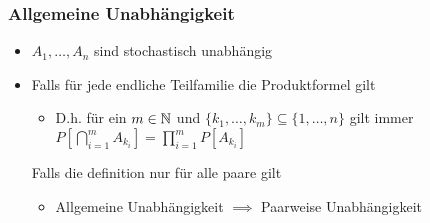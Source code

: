\subsubsection{Allgemeine Unabhängigkeit}
\begin{itemize}
    \item $A_1, \dots, A_n$ sind stochastisch unabhängig
    \item Falls für jede endliche Teilfamilie die Produktformel gilt
        \begin{itemize}
            \item D.h. für ein $m \in \mathbb{N}$ und $\{k_1,\dots, k_m\} \subseteq \{1, \dots, n\}$ gilt immer $ P \left[ \bigcap_{i=1}^m A_{k_i} \right] = \prod_{i=1}^m P[A_{k_i}]$
        \end{itemize}
     Falls die definition nur für alle paare gilt
        \begin{itemize}
            \item Allgemeine Unabhängigkeit $\implies$ Paarweise Unabhängigkeit
        \end{itemize}
\end{itemize}
